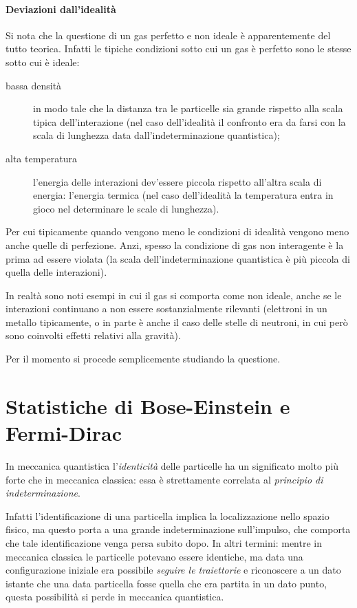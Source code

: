 \paragraph{Deviazioni dall'idealità} Si nota che la questione di un gas perfetto e non ideale è apparentemente del tutto teorica. Infatti le tipiche condizioni sotto cui un gas è perfetto sono le stesse sotto cui è ideale:
\begin{description}
	\item[bassa densità] in modo tale che la distanza tra le particelle sia grande rispetto alla scala tipica dell'interazione (nel caso dell'idealità il confronto era da farsi con la scala di lunghezza data dall'indeterminazione quantistica);
	\item[alta temperatura] l'energia delle interazioni dev'essere piccola rispetto all'altra scala di energia: l'energia termica (nel caso dell'idealità la temperatura entra in gioco nel determinare le scale di lunghezza).
\end{description}

Per cui tipicamente quando vengono meno le condizioni di idealità vengono meno anche quelle di perfezione. Anzi, spesso la condizione di gas non interagente è la prima ad essere violata (la scala dell'indeterminazione quantistica è più piccola di quella delle interazioni).

In realtà sono noti esempi in cui il gas si comporta come non ideale, anche se le interazioni continuano a non essere sostanzialmente rilevanti (elettroni in un metallo tipicamente, o in parte è anche il caso delle stelle di neutroni, in cui però sono coinvolti effetti relativi alla gravità).

Per il momento si procede semplicemente studiando la questione.

\section{Statistiche di Bose-Einstein e Fermi-Dirac}
\label{sec:BFstat}

In meccanica quantistica l'\textit{identicità} delle particelle ha un significato molto più forte che in meccanica classica: essa è strettamente correlata al \textit{principio di indeterminazione}.

Infatti l'identificazione di una particella implica la localizzazione nello spazio fisico, ma questo porta a una grande indeterminazione sull'impulso, che comporta che tale identificazione venga persa subito dopo. In altri termini: mentre in meccanica classica le particelle potevano essere identiche, ma data una configurazione iniziale era possibile \textit{seguire le traiettorie} e riconoscere a un dato istante che una data particella fosse quella che era partita in un dato punto, questa possibilità si perde in meccanica quantistica.
\newline

